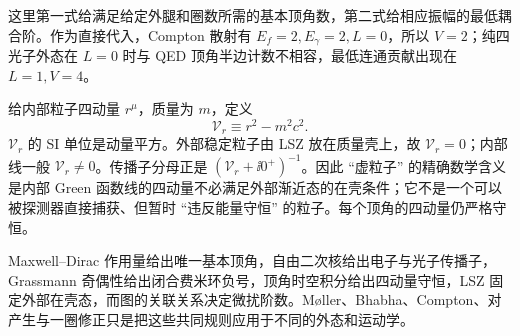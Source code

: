这里第一式给满足给定外腿和圈数所需的基本顶角数，第二式给相应振幅的最低耦合阶。作为直接代入，Compton 散射有 $E_f=2,E_\gamma=2,L=0$，所以 $V=2$；纯四光子外态在 $L=0$ 时与 QED 顶角半边计数不相容，最低连通贡献出现在 $L=1,V=4$。

给内部粒子四动量 $r^\mu$，质量为 $m$，定义
\begin{equation}
 \boxed{
 \mathcal V_r\equiv r^2-m^2c^2.}
 \label{eq:qed-virtuality-definition-dp7}
\end{equation}
$\mathcal V_r$ 的 SI 单位是动量平方。外部稳定粒子由 LSZ 放在质量壳上，故 $\mathcal V_r=0$；内部线一般 $\mathcal V_r\neq0$。传播子分母正是
$(\mathcal V_r+\ii0^+)^{-1}$。因此 ``虚粒子'' 的精确数学含义是内部 Green 函数线的四动量不必满足外部渐近态的在壳条件；它不是一个可以被探测器直接捕获、但暂时 ``违反能量守恒'' 的粒子。每个顶角的四动量仍严格守恒。


Maxwell--Dirac 作用量给出唯一基本顶角，自由二次核给出电子与光子传播子，Grassmann 奇偶性给出闭合费米环负号，顶角时空积分给出四动量守恒，LSZ 固定外部在壳态，而图的关联关系决定微扰阶数。M{\o}ller、Bhabha、Compton、对产生与一圈修正只是把这些共同规则应用于不同的外态和运动学。


